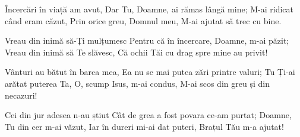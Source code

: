\beginverse
Încercări în viață am avut,
Dar Tu, Doamne, ai rămas lângă mine;
M-ai ridicat când eram căzut,
Prin orice greu, Domnul meu,
M-ai ajutat să trec cu bine.
\endverse

\beginchorus
Vreau din inimă să-Ți mulțumesc
Pentru că în încercare, Doamne, m-ai păzit;
Vreau din inimă să Te slăvesc,
Că ochii Tăi cu drag spre mine au privit!
\endchorus

\beginverse
Vânturi au bătut în barca mea,
Ea nu se mai putea zări printre valuri;
Tu Ți-ai arătat puterea Ta,
O, scump Isus, m-ai condus,
M-ai scos din greu și din necazuri!
\endverse

\beginverse
Cei din jur adesea n-au știut
Cât de grea a fost povara ce-am purtat;
Doamne, Tu din cer m-ai văzut,
Iar în dureri mi-ai dat puteri,
Brațul Tău m-a ajutat!
\endverse
\endsong